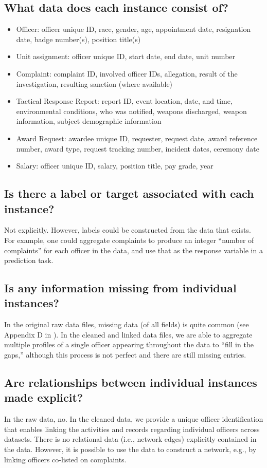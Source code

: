 \documentclass[letterpaper, 10 pt, conference]{ieeeconf}  %
\begin{document}
\subsection{What data does each instance consist of?}
\begin{itemize}
\item Officer: officer unique ID, race, gender, age, appointment date, resignation date, badge number(s), position title(s)
\item Unit assignment: officer unique ID, start date, end date, unit number
\item Complaint: complaint ID, involved officer IDs, allegation, result of the investigation, resulting sanction (where available)
\item Tactical Response Report: report ID, event location, date, and time, environmental conditions, who was notified, weapons discharged, weapon information, subject demographic information 
\item Award Request: awardee unique ID, requester, request date, award reference number, award type, request tracking number, incident dates, ceremony date
\item Salary: officer unique ID, salary, position title, pay grade, year
\end{itemize}

\subsection{Is there a label or target associated with each instance?}
Not explicitly. However, labels could be constructed from the data 
that exists. For example, one could aggregate complaints to produce
an integer ``number of complaints'' for each officer in the data,
and use that as the response variable in a prediction task.

\subsection{Is any information missing from individual instances?}
In the original raw data files, missing data (of all fields) is quite common
(see Appendix D in \cite{horel2021the}).  In the cleaned and linked data files, we are
able to aggregate multiple profiles of a single officer appearing throughout
the data to ``fill in the gaps,'' although this process is not perfect and
there are still missing entries.

\subsection{Are relationships between individual instances made explicit?}
In the raw data, no. In the cleaned data, we provide a unique officer
identification that enables linking the activities and records regarding
individual officers across datasets. There is no relational data (i.e., network edges)
explicitly contained in the data. However, it is possible to use the data
to construct a network, e.g., by linking officers co-listed on complaints.
\end{document}
